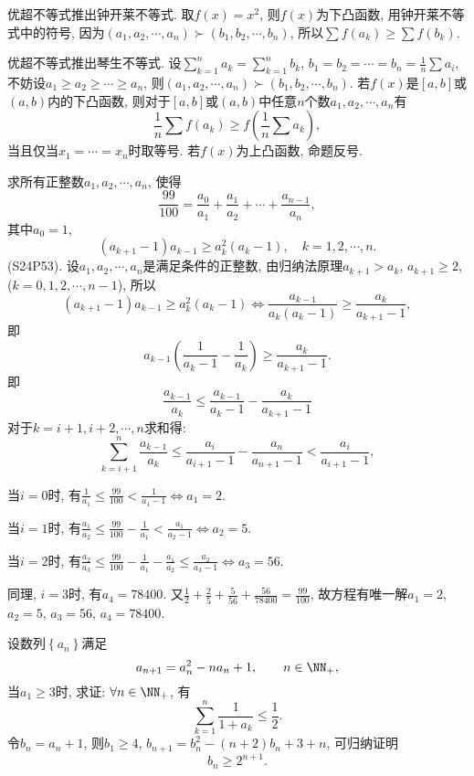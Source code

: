 \bq{}{}
优超不等式推出钟开莱不等式.
\eq
\ba
取$f\left(x\right)=x^{2}$, 则$f\left(x\right)$为下凸函数, 用钟开莱不等式中的符号,
因为$\left(a_{1},a_{2},\cdots,a_{n}\right)\succ\left(b_{1},b_{2},\cdots,b_{n}\right)$,
所以$\sum f\left(a_{k}\right)\ge\sum f\left(b_{k}\right)$.
\ea

\bq{}{}
优超不等式推出琴生不等式.
\eq
\ba
设$\sum_{k=1}^{n}a_{k}=\sum_{k=1}^{n}b_{k}$, $b_{1}=b_{2}=\cdots=b_{n}=\frac{1}{n}\sum a_{i}$,
不妨设$a_{1}\ge a_{2}\ge\cdots\ge a_{n}$, 则$\left(a_{1},a_{2},\cdots,a_{n}\right)\succ\left(b_{1},b_{2},\cdots,b_{n}\right)$.
若$f\left(x\right)$是$\left[a,b\right]$或$\left(a,b\right)$内的下凸函数,
则对于$\left[a,b\right]$或$\left(a,b\right)$中任意$n$个数$a_{1},a_{2},\cdots,a_{n}$有
\[
\frac{1}{n}\sum f\left(a_{k}\right)\ge f\left(\frac{1}{n}\sum a_{k}\right),
\]
当且仅当$x_{1}=\cdots=x_{n}$时取等号. 若$f\left(x\right)$为上凸函数, 命题反号.
\ea

\bq{}{}
求所有正整数$a_{1},a_{2},\cdots,a_{n}$, 使得
\[
\frac{99}{100}=\frac{a_{0}}{a_{1}}+\frac{a_{1}}{a_{2}}+\cdots+\frac{a_{n-1}}{a_{n}},
\]
其中$a_{0}=1$,
\[
\left(a_{k+1}-1\right)a_{k-1}\ge a_{k}^{2}\left(a_{k}-1\right),\quad k=1,2,\cdots,n.
\]
(S24P53).
\eq
\ba
设$a_{1},a_{2},\cdots,a_{n}$是满足条件的正整数, 由归纳法原理$a_{k+1}>a_{k}$,
$a_{k+1}\ge2$, ($k=0,1,2,\cdots,n-1$), 所以
\[
\left(a_{k+1}-1\right)a_{k-1}\ge a_{k}^{2}\left(a_{k}-1\right)\Longleftrightarrow\frac{a_{k-1}}{a_{k}\left(a_{k}-1\right)}\ge\frac{a_{k}}{a_{k+1}-1},
\]
即
\[
a_{k-1}\left(\frac{1}{a_{k}-1}-\frac{1}{a_{k}}\right)\ge\frac{a_{k}}{a_{k+1}-1}.
\]
即
\[
\frac{a_{k-1}}{a_{k}}\le\frac{a_{k-1}}{a_{k}-1}-\frac{a_{k}}{a_{k+1}-1}
\]
对于$k=i+1,i+2,\cdots,n$求和得:
\[
\sum_{k=i+1}^{n}\frac{a_{k-1}}{a_{k}}\le\frac{a_{i}}{a_{i+1}-1}-\frac{a_{n}}{a_{n+1}-1}<\frac{a_{i}}{a_{i+1}-1},
\]

当$i=0$时, 有$\frac{1}{a_{1}}\le\frac{99}{100}<\frac{1}{a_{1}-1}\Longleftrightarrow a_{1}=2$.

当$i=1$时, 有$\frac{a_{1}}{a_{2}}\le\frac{99}{100}-\frac{1}{a_{1}}<\frac{a_{1}}{a_{2}-1}\Longleftrightarrow a_{2}=5$.

当$i=2$时, 有$\frac{a_{2}}{a_{3}}\le\frac{99}{100}-\frac{1}{a_{1}}-\frac{a_{1}}{a_{2}}\le\frac{a_{2}}{a_{3}-1}\Longleftrightarrow a_{3}=56$.

同理, $i=3$时, 有$a_{4}=78400$. 又$\frac{1}{2}+\frac{2}{5}+\frac{5}{56}+\frac{56}{78400}=\frac{99}{100}$,
故方程有唯一解$a_{1}=2$, $a_{2}=5$, $a_{3}=56$, $a_{4}=78400$.
\ea

设数列$\left\{ a_{n}\right\} $满足
\[
a_{n+1}=a_{n}^{2}-na_{n}+1,\qquad n\in\NN_{+},
\]
当$a_{1}\ge3$时, 求证: $\forall n\in\NN_{+}$, 有
\[
\sum_{k=1}^{n}\frac{1}{1+a_{k}}\le\frac{1}{2}.
\]
\eq
\ba
令$b_{n}=a_{n}+1$, 则$b_{1}\ge4$, $b_{n+1}=b_{n}^{2}-\left(n+2\right)b_{n}+3+n$,
可归纳证明
\[
b_{n}\ge2^{n+1}.
\]
\ea

